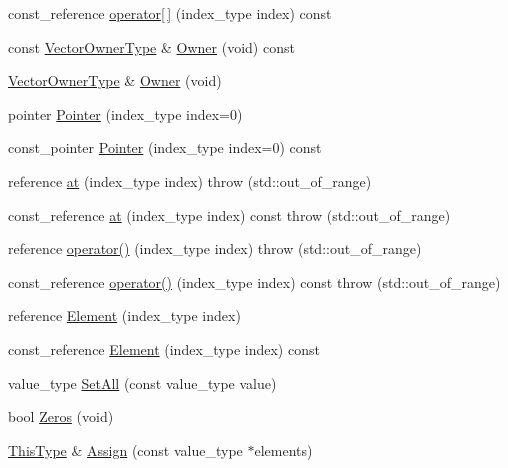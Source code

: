 \begin{DoxyCompactItemize}
\item 
const\+\_\+reference \hyperlink{classvct_dynamic_vector_base_a88f9f5af3f9381a5a96b60d1eddffe09}{operator\mbox{[}$\,$\mbox{]}} (index\+\_\+type index) const 
\item 
const \hyperlink{classvct_dynamic_vector_base_a563d79f5b4dd71f037192fe2961b48eb}{Vector\+Owner\+Type} \& \hyperlink{classvct_dynamic_vector_base_a0aaf6fd5bab4cbdf8d4fa82c714933f4}{Owner} (void) const 
\item 
\hyperlink{classvct_dynamic_vector_base_a563d79f5b4dd71f037192fe2961b48eb}{Vector\+Owner\+Type} \& \hyperlink{classvct_dynamic_vector_base_ab79d7986566cc243e97688fc3f715cfb}{Owner} (void)
\item 
pointer \hyperlink{classvct_dynamic_vector_base_a00f5d63bffcb55c825b0f75e91c8a291}{Pointer} (index\+\_\+type index=0)
\item 
const\+\_\+pointer \hyperlink{classvct_dynamic_vector_base_afd12e61375a9146ea5b6944b98dadf38}{Pointer} (index\+\_\+type index=0) const 
\item 
reference \hyperlink{classvct_dynamic_vector_base_a03f2316e98cb6eafca55501f12c9172a}{at} (index\+\_\+type index)  throw (std\+::out\+\_\+of\+\_\+range)
\item 
const\+\_\+reference \hyperlink{classvct_dynamic_vector_base_a29413207bf990dc9d3287646d4cc9737}{at} (index\+\_\+type index) const   throw (std\+::out\+\_\+of\+\_\+range)
\item 
reference \hyperlink{classvct_dynamic_vector_base_ae92326b64db6d69f66a07f84f2e4ba51}{operator()} (index\+\_\+type index)  throw (std\+::out\+\_\+of\+\_\+range)
\item 
const\+\_\+reference \hyperlink{classvct_dynamic_vector_base_a69688eb852e014ad42579da676dbb855}{operator()} (index\+\_\+type index) const   throw (std\+::out\+\_\+of\+\_\+range)
\item 
reference \hyperlink{classvct_dynamic_vector_base_a8b1a7efd0d0bb21b701a4461d79c7da2}{Element} (index\+\_\+type index)
\item 
const\+\_\+reference \hyperlink{classvct_dynamic_vector_base_a991666c27b8c59dbf0548aa635b8e3c5}{Element} (index\+\_\+type index) const 
\item 
value\+\_\+type \hyperlink{classvct_dynamic_vector_base_a0cf13429dcd83b565c3cbd7e30ecdec7}{Set\+All} (const value\+\_\+type value)
\item 
bool \hyperlink{classvct_dynamic_vector_base_a3b6cf5114c3971757b595c4181759393}{Zeros} (void)
\item 
\hyperlink{classvct_dynamic_const_vector_base_a39da273523717f678f54d3321ebca3dd}{This\+Type} \& \hyperlink{classvct_dynamic_vector_base_a321c52baa29a91ba074899f39c1d8c23}{Assign} (const value\+\_\+type $\ast$elements)

\end{DoxyCompactItemize}
